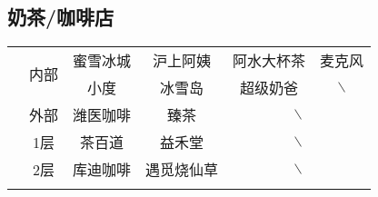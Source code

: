 \subsection[奶茶/咖啡店]{奶茶/咖啡店}
\begin{table}[!ht]
    \centering
    \begin{tabular}{|c|c|c|c|c|c|}
        \Xhline{1.2pt}
        \multirow{3}{*}{食堂} & \multirow{2}{*}{内部} & 蜜雪冰城 & 沪上阿姨  & 阿水大杯茶                             & 麦克风          \\
        \cline{3-6}
                            &                     & 小度   & 冰雪岛   & 超级奶爸                              & $\backslash$ \\
        \cline{2-6}
                            & 外部                  & 潍医咖啡 & 臻茶    & \multicolumn{2}{c|}{$\backslash$}                \\
        \Xhline{1.2pt}
        \multirow{2}{*}{大服} & 1层                  & 茶百道  & 益禾堂   & \multicolumn{2}{c|}{$\backslash$}                \\
        \cline{2-6}
                            & 2层                  & 库迪咖啡 & 遇觅烧仙草 & \multicolumn{2}{c|}{$\backslash$}                \\
        \Xhline{1.2pt}
    \end{tabular}
\end{table}

\newpage
